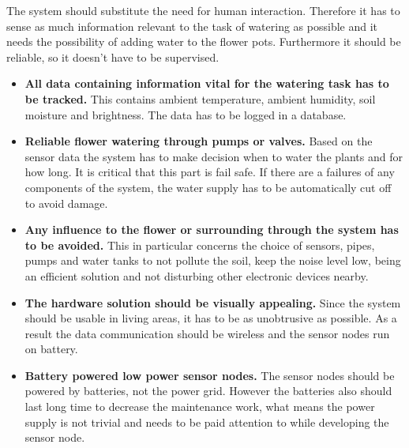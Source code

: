 
The system should substitute the need for human interaction. Therefore it has to sense as much information relevant to the task of watering as possible and it needs the possibility of adding water to the flower pots. Furthermore it should be reliable, so it doesn't have to be supervised.


\begin{itemize}
\item \textbf{All data containing information vital for the watering task has to be tracked.}
This contains ambient temperature, ambient humidity, soil moisture and brightness.
The data has to be logged in a database.

\item \textbf{Reliable flower watering through pumps or valves.}
Based on the sensor data the system has to make decision when to water the plants and for how long.
It is critical that this part is fail safe. If there are a failures of any components of the system, the water supply has to be automatically cut off to avoid damage.

\item \textbf{Any influence to the flower or surrounding through the system has to be avoided.}
This in particular concerns the choice of sensors, pipes, pumps and water tanks to not pollute the soil, keep the noise level low, being an efficient solution and not disturbing other electronic devices nearby.

\item \textbf{The hardware solution should be visually appealing.}
Since the system should be usable in living areas, it has to be as unobtrusive as possible.
As a result the data communication should be wireless and the sensor nodes run on battery.

\item \textbf{Battery powered low power sensor nodes.}
The sensor nodes should be powered by batteries, not the power grid. However the batteries also should last long time to decrease the maintenance work, what means the power supply is not trivial and needs to be paid attention to while developing the sensor node.

\end{itemize}